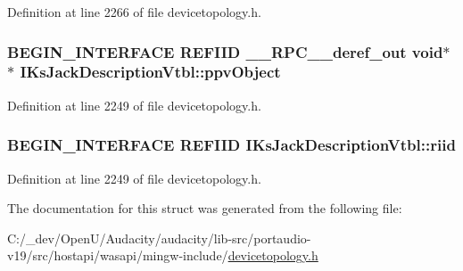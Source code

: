 Definition at line 2266 of file devicetopology.\+h.

\subsubsection[{\texorpdfstring{ppv\+Object}{ppvObject}}]{\setlength{\rightskip}{0pt plus 5cm}B\+E\+G\+I\+N\+\_\+\+I\+N\+T\+E\+R\+F\+A\+CE {\bf R\+E\+F\+I\+ID} {\bf \+\_\+\+\_\+\+R\+P\+C\+\_\+\+\_\+deref\+\_\+out} {\bf void}$\ast$$\ast$ I\+Ks\+Jack\+Description\+Vtbl\+::ppv\+Object}\hypertarget{struct_i_ks_jack_description_vtbl_a455ae8a816282031a7a35bf06aa10e05}{}\label{struct_i_ks_jack_description_vtbl_a455ae8a816282031a7a35bf06aa10e05}


Definition at line 2249 of file devicetopology.\+h.

\subsubsection[{\texorpdfstring{riid}{riid}}]{\setlength{\rightskip}{0pt plus 5cm}B\+E\+G\+I\+N\+\_\+\+I\+N\+T\+E\+R\+F\+A\+CE {\bf R\+E\+F\+I\+ID} I\+Ks\+Jack\+Description\+Vtbl\+::riid}\hypertarget{struct_i_ks_jack_description_vtbl_a831468fb23c24f770668644ca4dd708a}{}\label{struct_i_ks_jack_description_vtbl_a831468fb23c24f770668644ca4dd708a}


Definition at line 2249 of file devicetopology.\+h.



The documentation for this struct was generated from the following file\+:\begin{DoxyCompactItemize}
\item 
C\+:/\+\_\+dev/\+Open\+U/\+Audacity/audacity/lib-\/src/portaudio-\/v19/src/hostapi/wasapi/mingw-\/include/\hyperlink{devicetopology_8h}{devicetopology.\+h}\end{DoxyCompactItemize}
